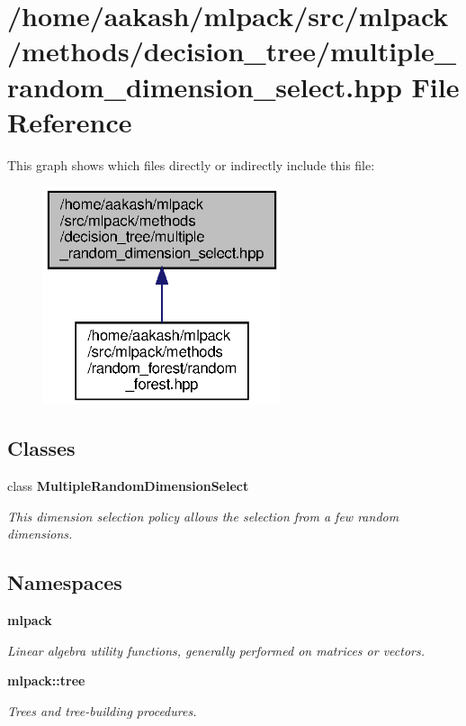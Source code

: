 \section{/home/aakash/mlpack/src/mlpack/methods/decision\+\_\+tree/multiple\+\_\+random\+\_\+dimension\+\_\+select.hpp File Reference}
\label{multiple__random__dimension__select_8hpp}
This graph shows which files directly or indirectly include this file\+:
\nopagebreak
\begin{figure}[H]
\begin{center}
\leavevmode
\includegraphics[width=198pt]{multiple__random__dimension__select_8hpp__dep__incl}
\end{center}
\end{figure}
\subsection*{Classes}
\begin{DoxyCompactItemize}
\item 
class \textbf{ Multiple\+Random\+Dimension\+Select}
\begin{DoxyCompactList}\small\item\em This dimension selection policy allows the selection from a few random dimensions. \end{DoxyCompactList}\end{DoxyCompactItemize}
\subsection*{Namespaces}
\begin{DoxyCompactItemize}
\item 
 \textbf{ mlpack}
\begin{DoxyCompactList}\small\item\em Linear algebra utility functions, generally performed on matrices or vectors. \end{DoxyCompactList}\item 
 \textbf{ mlpack\+::tree}
\begin{DoxyCompactList}\small\item\em Trees and tree-\/building procedures. \end{DoxyCompactList}\end{DoxyCompactItemize}


